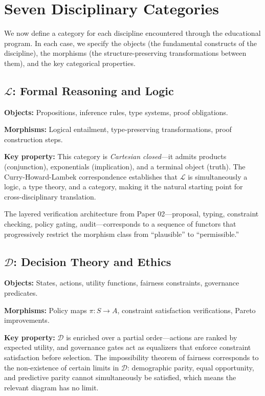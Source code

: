 \documentclass[11pt,a4paper]{article}
\begin{document}
\section{Seven Disciplinary Categories}
\label{sec:seven}

We now define a category for each discipline encountered through the educational program. In each case, we specify the objects (the fundamental constructs of the discipline), the morphisms (the structure-preserving transformations between them), and the key categorical properties.

\subsection{$\mathcal{L}$: Formal Reasoning and Logic}

\textbf{Objects:} Propositions, inference rules, type systems, proof obligations.

\textbf{Morphisms:} Logical entailment, type-preserving transformations, proof construction steps.

\textbf{Key property:} This category is \emph{Cartesian closed}---it admits products (conjunction), exponentials (implication), and a terminal object (truth). The Curry-Howard-Lambek correspondence \citep{lambek1986introduction} establishes that $\mathcal{L}$ is simultaneously a logic, a type theory, and a category, making it the natural starting point for cross-disciplinary translation.

The layered verification architecture from Paper 02---proposal, typing, constraint checking, policy gating, audit---corresponds to a sequence of functors that progressively restrict the morphism class from ``plausible'' to ``permissible.''

\subsection{$\mathcal{D}$: Decision Theory and Ethics}

\textbf{Objects:} States, actions, utility functions, fairness constraints, governance predicates.

\textbf{Morphisms:} Policy maps $\pi: S \to A$, constraint satisfaction verifications, Pareto improvements.

\textbf{Key property:} $\mathcal{D}$ is enriched over a partial order---actions are ranked by expected utility, and governance gates act as equalizers that enforce constraint satisfaction before selection. The impossibility theorem of fairness \citep{chouldechova2017fair, kleinberg2016inherent} corresponds to the non-existence of certain limits in $\mathcal{D}$: demographic parity, equal opportunity, and predictive parity cannot simultaneously be satisfied, which means the relevant diagram has no limit.
\end{document}
